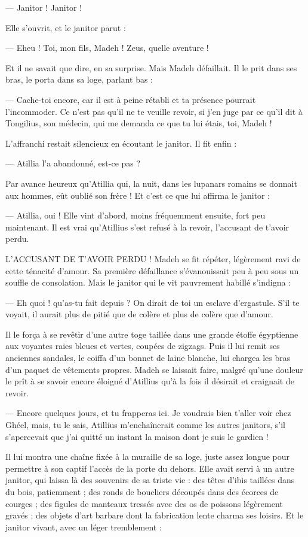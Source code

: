 \documentclass[a4paper, 11pt, oneside, polutonikogreek, french]{article}
\begin{document}
--- Janitor ! Janitor !

Elle s'ouvrit, et le janitor parut :

--- Eheu ! Toi, mon fils, Madeh ! Zeus, quelle aventure !

Et il ne savait que dire, en sa surprise. Mais Madeh défaillait. Il le prit dans ses bras, le porta dans sa loge, parlant bas :

--- Cache-toi encore, car il est à peine rétabli et ta présence pourrait l'incommoder. Ce n'est pas qu'il ne te veuille revoir, si j'en juge par ce qu'il dit à Tongilius, son médecin, qui me demanda ce que tu lui étais, toi, Madeh !

L'affranchi restait silencieux en écoutant le janitor. Il fit enfin :

--- Atillia l'a abandonné, est-ce pas ?

Par avance heureux qu'Atillia qui, la nuit, dans les lupanars romains se donnait aux hommes, eût oublié son frère ! Et c'est ce que lui affirma le janitor :

--- Atillia, oui ! Elle vint d'abord, moins fréquemment ensuite, fort peu maintenant. Il est vrai qu'Atillius s'est refusé à la revoir, l'accusant de t'avoir perdu.

L’ACCUSANT DE T’AVOIR PERDU ! Madeh se fit répéter, légèrement ravi de cette ténacité d'amour. Sa première défaillance s'évanouissait peu à peu sous un souffle de consolation. Mais le janitor qui le vit pauvrement habillé s'indigna :

--- Eh quoi ! qu'as-tu fait depuis ? On dirait de toi un esclave d'ergastule. S'il te voyait, il aurait plus de pitié que de colère et plus de colère que d'amour.

Il le força à se revêtir d'une autre toge taillée dans une grande étoffe égyptienne aux voyantes raies bleues et vertes, coupées de zigzags. Puis il lui remit ses anciennes sandales, le coiffa d'un bonnet de laine blanche, lui chargea les bras d'un paquet de vêtements propres. Madeh se laissait faire, malgré qu'une douleur le prît à se savoir encore éloigné d'Atillius qu'à la fois il désirait et craignait de revoir.

--- Encore quelques jours, et tu frapperas ici. Je voudrais bien t'aller voir chez Ghéel, mais, tu le sais, Atillius m'enchaînerait comme les autres janitors, s'il s'apercevait que j'ai quitté un instant la maison dont je suis le gardien !

Il lui montra une chaîne fixée à la muraille de sa loge, juste assez longue pour permettre à son captif l'accès de la porte du dehors. Elle avait servi à un autre janitor, qui laissa là des souvenirs de sa triste vie : des têtes d'ibis taillées dans du bois, patiemment ; des ronds de boucliers découpés dans des écorces de courges ; des figules de manteaux tressés avec des os de poissons légèrement gravés ; des objets d'art barbare dont la fabrication lente charma ses loisirs. Et le janitor vivant, avec un léger tremblement :
\end{document}
